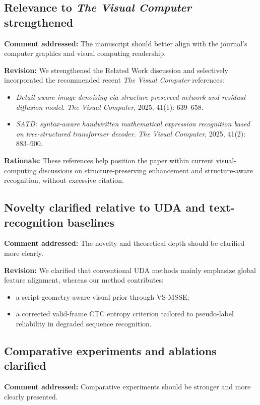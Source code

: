 \documentclass[11pt]{article}
\begin{document}
\subsection{Relevance to \textit{The Visual Computer} strengthened}
\textbf{Comment addressed:} The manuscript should better align with the journal's computer graphics and visual computing readership.

\textbf{Revision:} We strengthened the Related Work discussion and selectively incorporated the recommended recent \textit{The Visual Computer} references:
\begin{itemize}[leftmargin=1.5em]
\item \textit{Detail-aware image denoising via structure preserved network and residual diffusion model}. \textit{The Visual Computer}, 2025, 41(1): 639--658.
\item \textit{SATD: syntax-aware handwritten mathematical expression recognition based on tree-structured transformer decoder}. \textit{The Visual Computer}, 2025, 41(2): 883--900.
\end{itemize}

\textbf{Rationale:} These references help position the paper within current visual-computing discussions on structure-preserving enhancement and structure-aware recognition, without excessive citation.

\subsection{Novelty clarified relative to UDA and text-recognition baselines}
\textbf{Comment addressed:} The novelty and theoretical depth should be clarified more clearly.

\textbf{Revision:} We clarified that conventional UDA methods mainly emphasize global feature alignment, whereas our method contributes:
\begin{itemize}[leftmargin=1.5em]
\item a script-geometry-aware visual prior through VS-MSSE;
\item a corrected valid-frame CTC entropy criterion tailored to pseudo-label reliability in degraded sequence recognition.
\end{itemize}

\subsection{Comparative experiments and ablations clarified}
\textbf{Comment addressed:} Comparative experiments should be stronger and more clearly presented.
\end{document}
